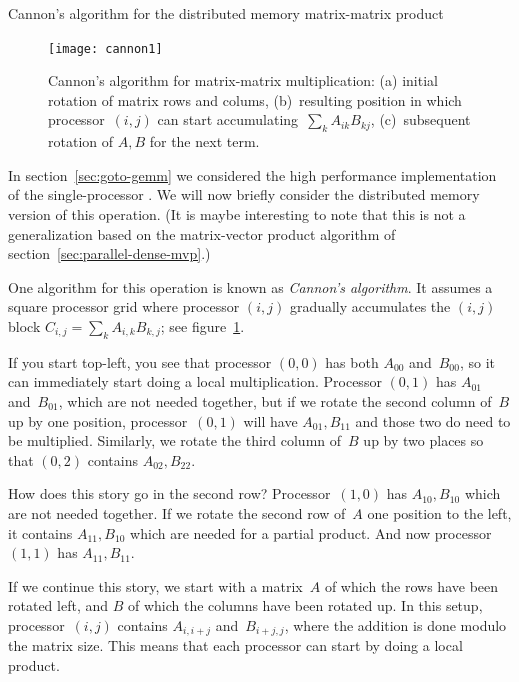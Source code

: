 

 {Cannon's algorithm for the distributed memory matrix-matrix product}

\begin{figure}
  \texttt{[image: cannon1]}
  \caption{Cannon's algorithm for matrix-matrix multiplication: (a) initial rotation of matrix rows and colums, (b)~resulting position in which processor~$(i,j)$ can start accumulating~$\sum_kA_{ik}B_{kj}$, (c)~subsequent rotation of $A,B$ for the next term.}
  \label{fig:cannon}
\end{figure}
%
In section~\ref{sec:goto-gemm} we considered the high performance
implementation of the single-processor .  We will now briefly consider the distributed memory
version of this operation.
%
(It is maybe interesting to note that this
is not a generalization based on the matrix-vector product algorithm
of section~\ref{sec:parallel-dense-mvp}.)

One algorithm for this operation is known as
\emph{Cannon's algorithm}.
It assumes a square processor grid where processor $(i,j)$ gradually
accumulates the $(i,j)$ block $C_{i,j}=\sum_kA_{i,k}B_{k,j}$;
see figure~\ref{fig:cannon}.

If you start top-left, you see that processor $(0,0)$ has both
$A_{00}$ and~$B_{00}$, so it can immediately start doing a local multiplication.
Processor $(0,1)$ has $A_{01}$ and~$B_{01}$, which are
not needed together, but if we rotate the second column of~$B$ up
by one position, processor~$(0,1)$ will have $A_{01},B_{11}$ and those
two do need to be multiplied. Similarly, we rotate the third column of~$B$
up by two places so that $(0,2)$ contains $A_{02},B_{22}$.

How does this story go in the second row? Processor~$(1,0)$ has
$A_{10},B_{10}$ which are not needed together. If we rotate
the second row of~$A$ one position to the left, it contains
$A_{11},B_{10}$ which are needed for a partial product.
And now processor~$(1,1)$ has $A_{11},B_{11}$.

If we continue this story, we start with a matrix~$A$ of which the
rows have been rotated left, and $B$ of which the columns have been rotated up.
In this setup, processor~$(i,j)$ contains $A_{i,i+j}$ and~$B_{i+j,j}$,
where the addition is done modulo the matrix size. This means that
each processor can start by doing a local product.

